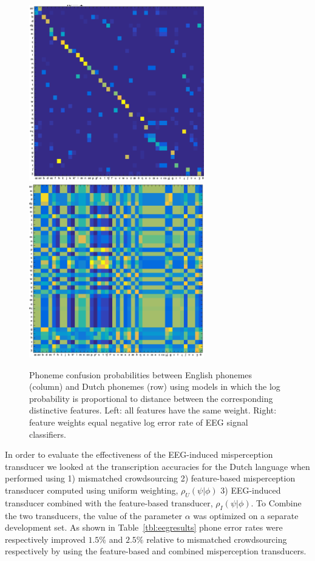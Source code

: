 \begin{figure}
  \centerline{
    \includegraphics[width=3in]{../figs/mirbagheri_dist_features.png}
    \includegraphics[width=3in]{../figs/mirbagheri_dist_eeg.png}
  }
  \caption{Phoneme confusion probabilities between English phonemes
    (column) and Dutch phonemes (row) using models in which the log
    probability is proportional to distance between the corresponding
    distinctive features.  Left: all features have the same
    weight.  Right: feature weights equal negative log error rate of
    EEG signal classifiers.}
  \label{fig:eeg_confusions}
\end{figure}

In order to evaluate the effectiveness of the EEG-induced misperception transducer we looked at the transcription accuracies for the Dutch language when performed using 1) mismatched crowdsourcing 2) feature-based misperception transducer computed using uniform weighting, $\rho_U(\psi|\phi)$ 3) EEG-induced transducer combined with the feature-based transducer, $\rho_I(\psi|\phi)$. To Combine the two transducers, the value of the parameter $\alpha$ was optimized on a separate development set. As shown in Table~\ref{tbl:eegresults} phone error rates were respectively improved $1.5\%$ and $2.5\%$ relative to mismatched crowdsourcing respectively by using the feature-based and combined misperception transducers. 

